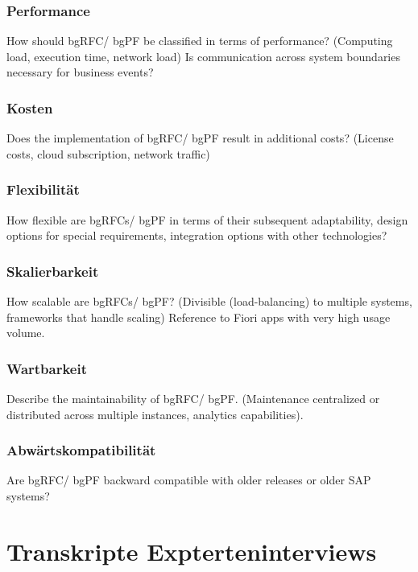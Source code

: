 \subsubsection{Performance}

How should bgRFC/ bgPF be classified in terms of performance? (Computing load, execution time, network load) Is communication across system boundaries necessary for business events?

\subsubsection{Kosten}

Does the implementation of bgRFC/ bgPF result in additional costs? (License costs, cloud subscription, network traffic)

\subsubsection{Flexibilität}

How flexible are bgRFCs/ bgPF in terms of their subsequent adaptability, design options for special requirements, integration options with other technologies?

\subsubsection{Skalierbarkeit}

How scalable are bgRFCs/ bgPF? (Divisible (load-balancing) to multiple systems, frameworks that handle scaling) Reference to Fiori apps with very high usage volume.

\subsubsection{Wartbarkeit}

Describe the maintainability of bgRFC/ bgPF. (Maintenance centralized or distributed across multiple instances, analytics capabilities).

\subsubsection{Abwärtskompatibilität}

Are bgRFC/ bgPF backward compatible with older releases or older SAP systems?

\section*{Transkripte Expterteninterviews}

